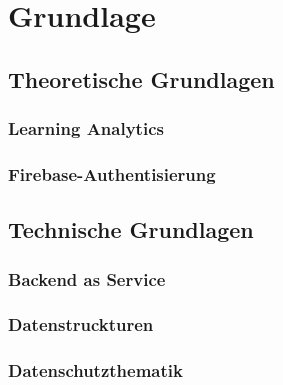 \chapter{Grundlage} %
\section{Theoretische Grundlagen}
\subsection{Learning Analytics}
\subsection{Firebase-Authentisierung}
\section{Technische Grundlagen}
\subsection{Backend as Service}
\subsection{Datenstruckturen}
\subsection{Datenschutzthematik}
